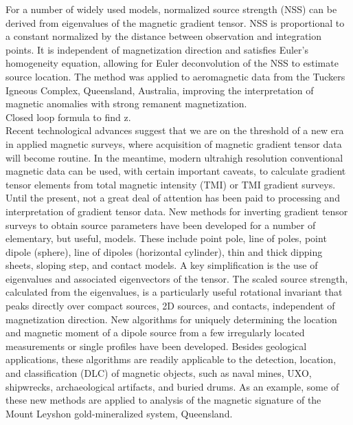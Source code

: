 \cite{NSS_analysis} 
For a number of widely used models, normalized source strength (NSS) can be derived from 
eigenvalues of the magnetic gradient tensor. NSS is proportional to a constant normalized 
by the distance between observation and integration points. It is independent of 
magnetization direction and satisfies Euler’s homogeneity equation, allowing for Euler 
deconvolution of the NSS to estimate source location. The method was applied to 
aeromagnetic data from the Tuckers Igneous Complex, Queensland, Australia, improving the 
interpretation of magnetic anomalies with strong remanent magnetization. \\

\cite{not_import_formula_z} 
Closed loop formula to find z. \\

\cite{NSS_analysis2} 
Recent technological advances suggest that we are on the threshold of a new era in 
applied magnetic surveys, where acquisition of magnetic gradient tensor data will become 
routine. In the meantime, modern ultrahigh resolution conventional magnetic data can be 
used, with certain important caveats, to calculate gradient tensor elements from total 
magnetic intensity (TMI) or TMI gradient surveys. Until the present, not a great deal of 
attention has been paid to processing and interpretation of gradient tensor data. New 
methods for inverting gradient tensor surveys to obtain source parameters have been 
developed for a number of elementary, but useful, models. These include point pole, line 
of poles, point dipole (sphere), line of dipoles (horizontal cylinder), thin and thick 
dipping sheets, sloping step, and contact models. A key simplification is the use of 
eigenvalues and associated eigenvectors of the tensor. The scaled source strength, 
calculated from the eigenvalues, is a particularly useful rotational invariant that peaks 
directly over compact sources, 2D sources, and contacts, independent of magnetization 
direction. New algorithms for uniquely determining the location and magnetic moment of a 
dipole source from a few irregularly located measurements or single profiles have been 
developed. Besides geological applications, these algorithms are readily applicable to 
the detection, location, and classification (DLC) of magnetic objects, such as naval 
mines, UXO, shipwrecks, archaeological artifacts, and buried drums. As an example, some 
of these new methods are applied to analysis of the magnetic signature of the Mount 
Leyshon gold-mineralized system, Queensland. \\

